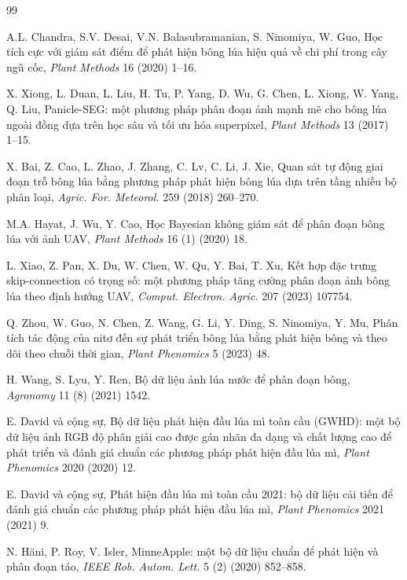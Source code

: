 \documentclass[12pt, a4paper]{article}
\begin{document}
\begin{thebibliography}{99}

A.L. Chandra, S.V. Desai, V.N. Balasubramanian, S. Ninomiya, W. Guo,
Học tích cực với giám sát điểm để phát hiện bông lúa hiệu quả về chi phí trong cây ngũ cốc,
\textit{Plant Methods} 16 (2020) 1--16.

X. Xiong, L. Duan, L. Liu, H. Tu, P. Yang, D. Wu, G. Chen, L. Xiong, W. Yang, Q. Liu,
Panicle-SEG: một phương pháp phân đoạn ảnh mạnh mẽ cho bông lúa ngoài đồng dựa trên học sâu
và tối ưu hóa superpixel,
\textit{Plant Methods} 13 (2017) 1--15.

X. Bai, Z. Cao, L. Zhao, J. Zhang, C. Lv, C. Li, J. Xie,
Quan sát tự động giai đoạn trỗ bông lúa bằng phương pháp phát hiện bông lúa dựa trên tầng
nhiều bộ phân loại,
\textit{Agric. For. Meteorol.} 259 (2018) 260--270.

M.A. Hayat, J. Wu, Y. Cao,
Học Bayesian không giám sát để phân đoạn bông lúa với ảnh UAV,
\textit{Plant Methods} 16 (1) (2020) 18.

L. Xiao, Z. Pan, X. Du, W. Chen, W. Qu, Y. Bai, T. Xu,
Kết hợp đặc trưng skip-connection có trọng số: một phương pháp tăng cường phân đoạn ảnh bông
lúa theo định hướng UAV,
\textit{Comput. Electron. Agric.} 207 (2023) 107754.

Q. Zhou, W. Guo, N. Chen, Z. Wang, G. Li, Y. Ding, S. Ninomiya, Y. Mu,
Phân tích tác động của nitơ đến sự phát triển bông lúa bằng phát hiện bông và theo dõi theo
chuỗi thời gian,
\textit{Plant Phenomics} 5 (2023) 48.

H. Wang, S. Lyu, Y. Ren,
Bộ dữ liệu ảnh lúa nước để phân đoạn bông,
\textit{Agronomy} 11 (8) (2021) 1542.

E. David và cộng sự,
Bộ dữ liệu phát hiện đầu lúa mì toàn cầu (GWHD): một bộ dữ liệu ảnh RGB độ phân giải cao
được gán nhãn đa dạng và chất lượng cao để phát triển và đánh giá chuẩn các phương pháp phát
hiện đầu lúa mì,
\textit{Plant Phenomics} 2020 (2020) 12.

E. David và cộng sự,
Phát hiện đầu lúa mì toàn cầu 2021: bộ dữ liệu cải tiến để đánh giá chuẩn các phương pháp
phát hiện đầu lúa mì,
\textit{Plant Phenomics} 2021 (2021) 9.

N. H{\"a}ni, P. Roy, V. Isler,
MinneApple: một bộ dữ liệu chuẩn để phát hiện và phân đoạn táo,
\textit{IEEE Rob. Autom. Lett.} 5 (2) (2020) 852--858.


\end{thebibliography}
\end{document}
